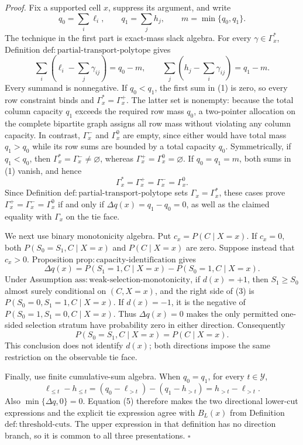 \noindent\textit{Proof.}
Fix a supported cell \(x\), suppress its argument, and write
\[
q_0=\sum_i\ell_i,\qquad q_1=\sum_jh_j,
\qquad m=\min\{q_0,q_1\}.
\]
The technique in the first part is exact-mass slack algebra.  For every
\(\gamma\in\Gamma_x^{\ast}\), Definition
\(\mathrm{def{:}partial\text{-}transport\text{-}polytope}\) gives
\[
\sum_i\left(\ell_i-\sum_j\gamma_{ij}\right)=q_0-m,
\qquad
\sum_j\left(h_j-\sum_i\gamma_{ij}\right)=q_1-m.
\tag{1}
\]
Every summand is nonnegative.  If \(q_0<q_1\), the first sum in (1) is
zero, so every row constraint binds and
\(\Gamma_x^{\ast}=\Gamma_x^{+}\).  The latter set is nonempty: because
the total column capacity \(q_1\) exceeds the required row mass \(q_0\),
a two-pointer allocation on the complete bipartite graph assigns all row
mass without violating any column capacity.  In contrast,
\(\Gamma_x^{-}\) and \(\Gamma_x^{0}\) are empty, since either would have
total mass \(q_1>q_0\) while its row sums are bounded by a total capacity
\(q_0\).  Symmetrically, if \(q_1<q_0\), then
\(\Gamma_x^{\ast}=\Gamma_x^{-}\ne\varnothing\), whereas
\(\Gamma_x^{+}=\Gamma_x^{0}=\varnothing\).  If \(q_0=q_1=m\), both
sums in (1) vanish, and hence
\[
\Gamma_x^{\ast}=\Gamma_x^{+}=\Gamma_x^{-}=\Gamma_x^{0}.
\tag{2}
\]
Since Definition \(\mathrm{def{:}partial\text{-}transport\text{-}polytope}\)
sets \(\Gamma_x=\Gamma_x^{\ast}\), these cases prove
\(\Gamma_x^{+}=\Gamma_x^{-}=\Gamma_x^{0}\) if and only if
\(\Delta q(x)=q_1-q_0=0\), as well as the claimed equality with
\(\Gamma_x\) on the tie face.

We next use binary monotonicity algebra.  Put
\(c_x=P(C\mid X=x)\).  If \(c_x=0\), both
\(P(S_0=S_1,C\mid X=x)\) and \(P(C\mid X=x)\) are zero.  Suppose instead
that \(c_x>0\).  Proposition
\(\mathrm{prop{:}capacity\text{-}identification}\) gives
\[
\Delta q(x)=P(S_1=1,C\mid X=x)-P(S_0=1,C\mid X=x).
\tag{3}
\]
Under Assumption \(\mathrm{ass{:}weak\text{-}selection\text{-}monotonicity}\),
if \(d(x)=+1\), then \(S_1\ge S_0\) almost surely conditional on
\((C,X=x)\), and the right side of (3) is
\(P(S_0=0,S_1=1,C\mid X=x)\).  If \(d(x)=-1\), it is the negative of
\(P(S_0=1,S_1=0,C\mid X=x)\).  Thus \(\Delta q(x)=0\) makes the only
permitted one-sided selection stratum have probability zero in either
direction.  Consequently
\[
P(S_0=S_1,C\mid X=x)=P(C\mid X=x).
\tag{4}
\]
This conclusion does not identify \(d(x)\); both directions impose the
same restriction on the observable tie face.

Finally, use finite cumulative-sum algebra.  When \(q_0=q_1\), for every
\(t\in\mathcal Y\),
\[
\ell_{\le t}-h_{\le t}
=(q_0-\ell_{>t})-(q_1-h_{>t})
=h_{>t}-\ell_{>t}.
\tag{5}
\]
Also \(\min\{\Delta q,0\}=0\).  Equation (5) therefore makes the two
directional lower-cut expressions and the explicit tie expression agree
with \(B_L(x)\) from Definition \(\mathrm{def{:}threshold\text{-}cuts}\).
The upper expression in that definition has no direction branch, so it is
common to all three presentations. \(\square\)
